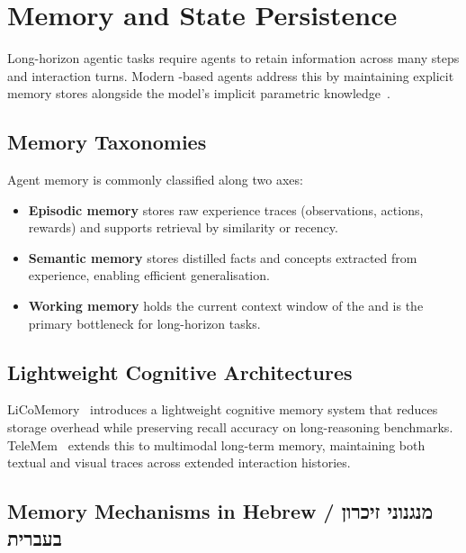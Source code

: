 \chapter{Memory and State Persistence}
\label{chap:memory}

Long-horizon agentic tasks require agents to retain information across many
steps and interaction turns.
Modern \LLM{}-based agents address this by maintaining explicit memory
stores alongside the model's implicit parametric knowledge~\cite{huang2025licomemory,chen2025telemem}.

\section{Memory Taxonomies}
\label{sec:memory-taxonomy}

Agent memory is commonly classified along two axes:

\begin{itemize}
  \item \textbf{Episodic memory} stores raw experience traces (observations,
        actions, rewards) and supports retrieval by similarity or recency.
  \item \textbf{Semantic memory} stores distilled facts and concepts
        extracted from experience, enabling efficient generalisation.
  \item \textbf{Working memory} holds the current context window of the
        \LLM{} and is the primary bottleneck for long-horizon tasks.
\end{itemize}

\section{Lightweight Cognitive Architectures}
\label{sec:memory-lightcog}

LiCoMemory~\cite{huang2025licomemory} introduces a lightweight cognitive
memory system that reduces storage overhead while preserving recall accuracy
on long-reasoning benchmarks.
TeleMem~\cite{chen2025telemem} extends this to multimodal long-term memory,
maintaining both textual and visual traces across extended interaction histories.

\section{Memory Mechanisms in Hebrew / מנגנוני זיכרון בעברית}
\label{sec:memory-bidi}

